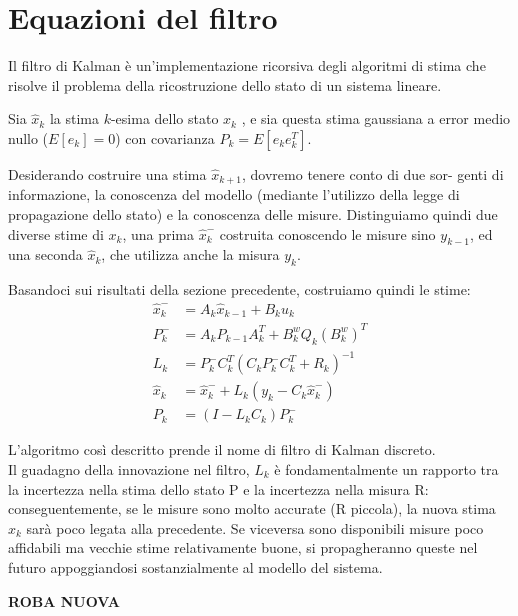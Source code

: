 \section{Equazioni del filtro}

Il filtro di Kalman è un'implementazione ricorsiva degli algoritmi di stima che risolve il problema della ricostruzione dello stato di un sistema lineare.

Sia $\hat{x}_k$ la stima $k$-esima dello stato $x_k$ , e sia questa stima gaussiana a error medio nullo ($E[e_k] = 0$) con covarianza $P_k=E[e_ke_k^T]$.

Desiderando costruire una stima $\hat{x}_{k+1}$, dovremo tenere conto di due sor-
genti di informazione, la conoscenza del modello (mediante l’utilizzo della
legge di propagazione dello stato) e la conoscenza delle misure. Distinguiamo
quindi due diverse stime di $x_k$, una prima $\hat{x}_k^-$ costruita conoscendo le misure sino $y_{k-1}$, ed una seconda $\hat{x}_k$, che utilizza anche la misura $y_{k}$.

Basandoci sui risultati della sezione precedente, costruiamo quindi le stime:
\begin{align}
\hat{x}_k^- &= A_k\hat{x}_{k-1} + B_ku_k \\
P_k^- &= A_kP_{k-1}A_k^T + B^w_kQ_k(B^w_k)^T \\
L_k &= P_k^-C_k^T(C_kP_k^-C_k^T + R_k)^{-1}\\
\hat{x}_k &= \hat{x}_k^- + L_k(y_k - C_k\hat{x}_k^-)\\
P_k &= (I - L_kC_k)P_k^-
\end{align}

L’algoritmo così descritto prende il nome di filtro di Kalman discreto. \\ Il guadagno della innovazione nel filtro, $L_k$ è fondamentalmente un rapporto tra la incertezza nella stima dello stato P e la incertezza nella misura R: conseguentemente, se le misure sono molto accurate (R piccola), la nuova stima $\hat{x}_k$ sarà poco legata alla precedente. Se viceversa sono disponibili misure poco affidabili ma vecchie stime relativamente buone, si propagheranno queste nel futuro appoggiandosi sostanzialmente al modello del sistema.

\newpage

\textbf{ROBA NUOVA}

